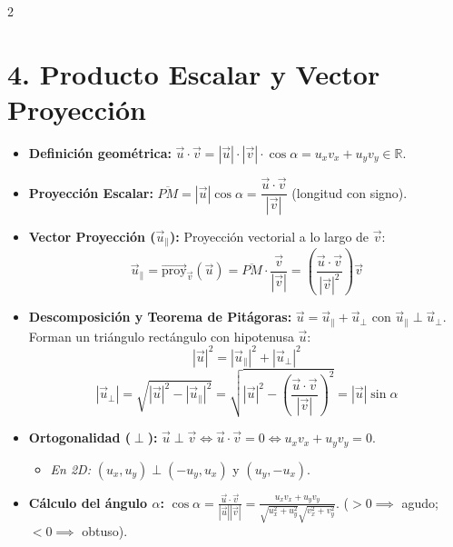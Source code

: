 \documentclass[9pt,a4paper]{article}
\begin{document}
\begin{multicols}{2}
\section{4. Producto Escalar y Vector Proyección}
\begin{itemize}
    \item \textbf{Definición geométrica:} $\vec{u} \cdot \vec{v} = |\vec{u}| \cdot |\vec{v}| \cdot \cos \alpha = u_x v_x + u_y v_y \in \mathbb{R}$.
    \item \textbf{Proyección Escalar:} $\overline{PM} = |\vec{u}|\cos\alpha = \dfrac{\vec{u}\cdot\vec{v}}{|\vec{v}|}$ (longitud con signo).
    \item \textbf{Vector Proyección ($\vec{u}_\parallel$):} Proyección vectorial a lo largo de $\vec{v}$:
    $$\vec{u}_\parallel = \vec{\text{proy}}_{\vec{v}}(\vec{u}) = \overline{PM}\cdot \frac{\vec{v}}{|\vec{v}|} = \left(\frac{\vec{u}\cdot\vec{v}}{|\vec{v}|^2}\right)\vec{v}$$
    \item \textbf{Descomposición y Teorema de Pitágoras:} $\vec{u} = \vec{u}_\parallel + \vec{u}_\perp$ con $\vec{u}_\parallel \perp \vec{u}_\perp$. Forman un triángulo rectángulo con hipotenusa $\vec{u}$:
    $$|\vec{u}|^2 = |\vec{u}_\parallel|^2 + |\vec{u}_\perp|^2$$
    $$|\vec{u}_\perp| = \sqrt{|\vec{u}|^2 - |\vec{u}_\parallel|^2} = \sqrt{|\vec{u}|^2 - \left(\frac{\vec{u}\cdot\vec{v}}{|\vec{v}|}\right)^2} = |\vec{u}|\sin\alpha$$
    \item \textbf{Ortogonalidad ($\perp$):} $\vec{u} \perp \vec{v} \iff \vec{u}\cdot\vec{v} = 0 \iff u_x v_x + u_y v_y = 0$.
    \begin{itemize}
        \item \textit{En 2D:} $(u_x, u_y) \perp (-u_y, u_x)$ y $(u_y, -u_x)$.
    \end{itemize}
    \item \textbf{Cálculo del ángulo $\alpha$:}
    $\cos \alpha = \frac{\vec{u}\cdot\vec{v}}{|\vec{u}||\vec{v}|} = \frac{u_x v_x + u_y v_y}{\sqrt{u_x^2+u_y^2}\sqrt{v_x^2+v_y^2}}$.
    ($>0 \implies$ agudo; $<0 \implies$ obtuso).
\end{itemize}


\end{multicols}
\end{document}
